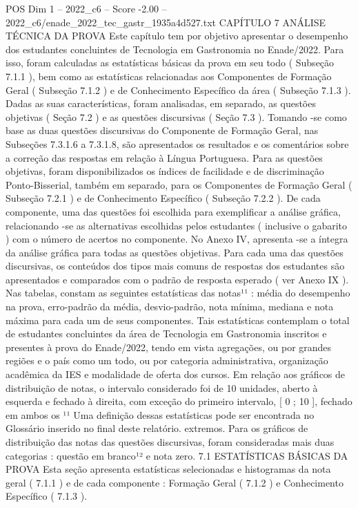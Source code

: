 \begin{textsample}{POS Dim 1 – 2022\_c6 – Score -2.00 – 2022\_c6/enade\_2022\_tec\_gastr\_1935a4d527.txt}  \label{ex:f1_pos_267}
CAPÍTULO 7 ANÁLISE TÉCNICA DA PROVA Este capítulo tem por objetivo apresentar o desempenho dos estudantes concluintes de Tecnologia em Gastronomia no Enade/2022.
Para isso, foram calculadas as estatísticas básicas da prova em seu todo ( Subseção 7.1.1 ), bem como as estatísticas relacionadas aos Componentes de Formação Geral ( Subseção 7.1.2 ) e de Conhecimento Específico da área ( Subseção 7.1.3 ).
Dadas as suas características, foram analisadas, em separado, as questões objetivas ( Seção 7.2 ) e as questões discursivas ( Seção 7.3 ).
Tomando -se como base as duas questões discursivas do Componente de Formação Geral, nas Subseções 7.3.1.6 a 7.3.1.8, são apresentados os resultados e os comentários sobre a correção das respostas em relação à Língua Portuguesa.
Para as questões objetivas, foram disponibilizados os índices de facilidade e de discriminação Ponto-Bisserial, também em separado, para os Componentes de Formação Geral ( Subseção 7.2.1 ) e de Conhecimento Específico ( Subseção 7.2.2 ).
De cada componente, uma das questões foi escolhida para exemplificar a análise gráfica, relacionando -se as alternativas escolhidas pelos estudantes ( inclusive o gabarito ) com o número de acertos no componente.
No Anexo IV, apresenta -se a íntegra da análise gráfica para todas as questões objetivas.
Para cada uma das questões discursivas, os conteúdos dos tipos mais comuns de respostas dos estudantes são apresentados e comparados com o padrão de resposta esperado ( ver Anexo IX ).
Nas tabelas, constam as seguintes estatísticas das notas¹¹ : média do desempenho na prova, erro-padrão da média, desvio-padrão, nota mínima, mediana e nota máxima para cada um de seus componentes.
Tais estatísticas contemplam o total de estudantes concluintes da área de Tecnologia em Gastronomia inscritos e presentes à prova do Enade/2022, tendo em vista agregações, ou por grandes regiões e o país como um todo, ou por categoria administrativa, organização acadêmica da IES e modalidade de oferta dos cursos.
Em relação aos gráficos de distribuição de notas, o intervalo considerado foi de 10 unidades, aberto à esquerda e fechado à direita, com exceção do primeiro intervalo, [ 0 ; 10 ], fechado em ambos os ¹¹ Uma definição dessas estatísticas pode ser encontrada no Glossário inserido no final deste relatório. extremos.
Para os gráficos de distribuição das notas das questões discursivas, foram consideradas mais duas categorias : questão em branco¹² e nota zero. 7.1 ESTATÍSTICAS BÁSICAS DA PROVA Esta seção apresenta estatísticas selecionadas e histogramas da nota geral ( 7.1.1 ) e de cada componente : Formação Geral ( 7.1.2 ) e Conhecimento Específico ( 7.1.3 ).

\end{textsample}
